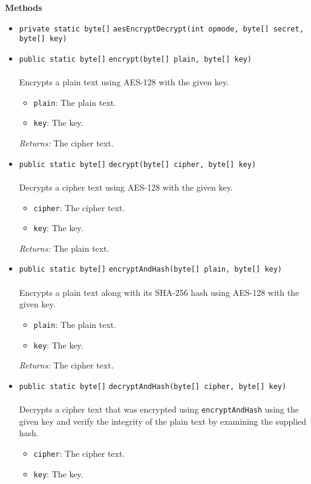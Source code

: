 \textbf{\sffamily Methods}
\begin{itemize}
\item \lstinline|private static byte[]| \lstinline|aesEncryptDecrypt|\lstinline|(int opmode, byte[] secret, byte[] key)| \\[-0.6em]




\item \lstinline|public static byte[]| \lstinline|encrypt|\lstinline|(byte[] plain, byte[] key)|\\ \\[-0.6em]
Encrypts a plain text using AES-128 with the given key.
\begin{itemize}
\item \lstinline|plain|: The plain text.
\item \lstinline|key|: The key.
\end{itemize}

\emph{Returns:} The cipher text.

\item \lstinline|public static byte[]| \lstinline|decrypt|\lstinline|(byte[] cipher, byte[] key)|\\ \\[-0.6em]
Decrypts a cipher text using AES-128 with the given key.
\begin{itemize}
\item \lstinline|cipher|: The cipher text.
\item \lstinline|key|: The key.
\end{itemize}

\emph{Returns:} The plain text.

\item \lstinline|public static byte[]| \lstinline|encryptAndHash|\lstinline|(byte[] plain, byte[] key)|\\ \\[-0.6em]
Encrypts a plain text along with its SHA-256 hash using AES-128 with the given key.
\begin{itemize}
\item \lstinline|plain|: The plain text.
\item \lstinline|key|: The key.
\end{itemize}

\emph{Returns:} The cipher text.

\item \lstinline|public static byte[]| \lstinline|decryptAndHash|\lstinline|(byte[] cipher, byte[] key)|\\ \\[-0.6em]
Decrypts a cipher text that was encrypted using \lstinline|encryptAndHash|
 using the given key and verify the integrity of the plain text by
 examining the supplied hash.
\begin{itemize}
\item \lstinline|cipher|: The cipher text.
\item \lstinline|key|: The key.
\end{itemize}


\end{itemize}
